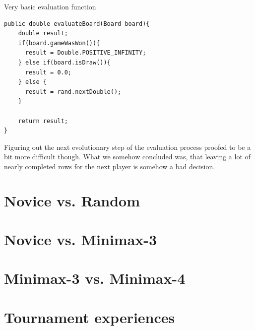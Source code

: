 \documentclass{scrartcl}
\begin{document}
\begin{listing}[H]
\caption{Very basic evaluation function}
\begin{verbatim}
public double evaluateBoard(Board board){
    double result;
    if(board.gameWasWon()){
      result = Double.POSITIVE_INFINITY;
    } else if(board.isDraw()){
      result = 0.0;
    } else {
      result = rand.nextDouble();
    }

    return result;
}
\end{verbatim}
\end{listing}

Figuring out the next evolutionary step of the evaluation process proofed to be a bit more difficult though. What we somehow concluded was, that leaving a lot of nearly completed rows for the next player is somehow a bad decision.

\section{Novice vs. Random}

\section{Novice vs. Minimax-3}

\section{Minimax-3 vs. Minimax-4}

\section{Tournament experiences}
\end{document}
